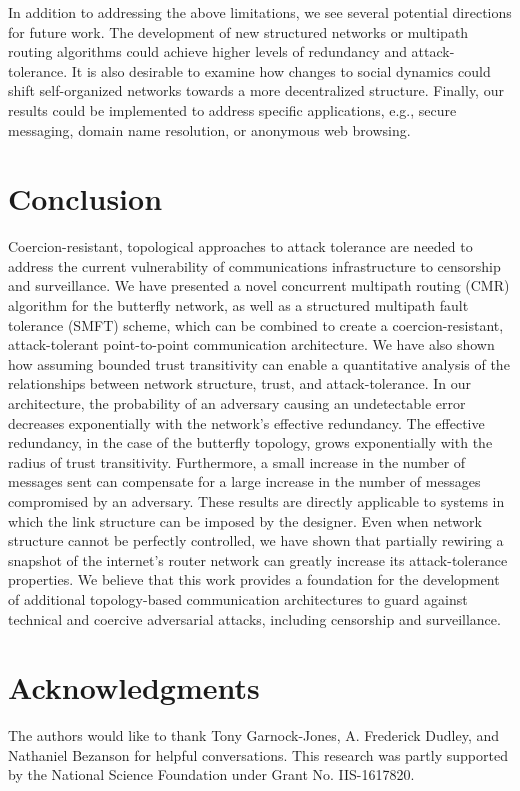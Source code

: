 \documentclass[10pt,letterpaper]{article}
\begin{document}
In addition to addressing the above limitations,
we see several potential directions for future work.
The development of new structured networks or multipath routing algorithms
could achieve higher levels of redundancy and attack-tolerance.
It is also desirable to examine how changes to social dynamics could shift
self-organized networks towards a more decentralized structure.
Finally, our results could be implemented to address specific applications, e.g.,
secure messaging, domain name resolution, or anonymous web browsing.

\section*{Conclusion}
\label{sec-conclusion}

Coercion-resistant, topological approaches to attack tolerance are needed to
address the current vulnerability of communications infrastructure to
censorship and surveillance.
We have presented a novel concurrent multipath routing (CMR)
algorithm for the butterfly network,
as well as a structured multipath fault tolerance (SMFT) scheme,
which can be combined to create a coercion-resistant,
attack-tolerant point-to-point communication architecture.
We have also shown how assuming bounded trust
transitivity can enable a quantitative analysis of the
relationships between network structure, trust, and attack-tolerance.
In our architecture,
the probability of an adversary causing an undetectable error
decreases exponentially with the network's effective redundancy.
The effective redundancy, in the case of the butterfly topology,
grows exponentially with the radius of trust transitivity.
Furthermore, a small increase in the number of messages sent can compensate
for a large increase in the number of messages compromised by an adversary.
These results are directly applicable to systems in which the link
structure can be imposed by the designer.
Even when network structure cannot be perfectly controlled,
we have shown that partially rewiring a snapshot of the internet's router network
can greatly increase its attack-tolerance properties.
We believe that this work provides a foundation for the
development of additional topology-based communication
architectures to guard against technical and coercive adversarial attacks,
including censorship and surveillance.

\section*{Acknowledgments}
The authors would like to thank Tony Garnock-Jones, A. Frederick Dudley, and
Nathaniel Bezanson for helpful conversations.
This research was partly supported by the National Science Foundation under
Grant No. IIS-1617820.
\end{document}
